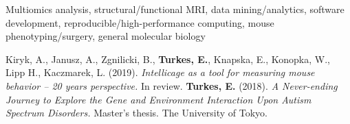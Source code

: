 %
%
%

\vspace*{-0.2cm}

\begin{cvskills}

    {Multiomics analysis, structural/functional MRI, data mining/analytics, software
        development, reproducible/high-performance computing, mouse phenotyping/surgery, general molecular biology}

    \vspace*{-0.1cm}
    {Kiryk, A., Janusz, A., Zgnilicki, B., \textbf{Turkes, E.}, Knapska, E.,
        Konopka, W., Lipp H., Kaczmarek, L. (2019).
        \vspace*{-0.001cm}}
    \cvskill{}
    {\hspace*{20pt}\textit{Intellicage as a tool for measuring mouse behavior – 20
        years perspective.} In review.}
    \vspace*{-0.1cm}
    \cvskill{}
    {\textbf{Turkes, E.} (2018). \textit{A Never-ending Journey to Explore the
        Gene and Environment Interaction Upon Autism}\vspace*{-0.001cm}}
    \cvskill{}
    {\hspace*{20pt}\textit{Spectrum Disorders.} Master's thesis. The University of
        Tokyo.}

\vspace*{-1cm}
\end{cvskills}
